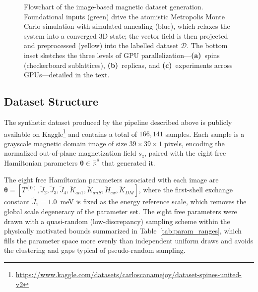 \documentclass[letterpaper, 12, one column]{article}
\begin{document}
\begin{figure}[H]
    \centering
    \resizebox{\linewidth}{!}{
    }
 \caption{Flowchart of the image-based magnetic dataset generation. Foundational inputs (green) drive the atomistic Metropolis Monte Carlo simulation with simulated annealing (blue), which relaxes the system into a converged 3D state; the vector field is then projected and preprocessed (yellow) into the labelled dataset $\mathcal{D}$. The bottom inset sketches the three levels of GPU parallelization---\textbf{(a)}~spins (checkerboard sublattices), \textbf{(b)}~replicas, and \textbf{(c)}~experiments across GPUs---detailed in the text.}
    \label{fig:methodology_flowchart}
\end{figure}

\subsection{Dataset Structure}\label{sec:training_datasets}

The synthetic dataset produced by the pipeline described above is publicly available on Kaggle\footnote{\url{https://www.kaggle.com/datasets/carloscanamejoy/dataset-spines-united-v2}} and contains a total of $166{,}141$ samples. Each sample is a grayscale magnetic domain image of size $39 \times 39 \times 1$ pixels, encoding the normalized out-of-plane magnetization field $s_z$, paired with the eight free Hamiltonian parameters $\boldsymbol{\theta} \in \mathbb{R}^8$ that generated it.

The eight free Hamiltonian parameters associated with each image are $\boldsymbol{\theta} = [T^{(0)}, \tilde{J}_2, \tilde{J}_3, \tilde{J}_4, \tilde{K}_{an1}, \tilde{K}_{anS}, \tilde{H}_{ex}, \tilde{K}_{DM}]$, where the first-shell exchange constant $\tilde{J}_1 = 1.0$~meV is fixed as the energy reference scale, which removes the global scale degeneracy of the parameter set. The eight free parameters were drawn with a quasi-random (low-discrepancy) sampling scheme within the physically motivated bounds summarized in Table~\ref{tab:param_ranges}, which fills the parameter space more evenly than independent uniform draws and avoids the clustering and gaps typical of pseudo-random sampling.
\end{document}
